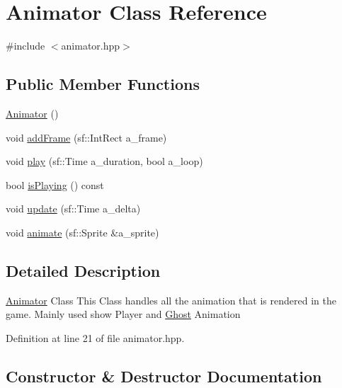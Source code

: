 \hypertarget{class_animator}{}\section{Animator Class Reference}
\label{class_animator}


{\ttfamily \#include $<$animator.\+hpp$>$}

\subsection*{Public Member Functions}
\begin{DoxyCompactItemize}
\item 
\hyperlink{class_animator_a701eeb9283612be2027425efb06bbff7}{Animator} ()
\item 
void \hyperlink{class_animator_a69e57eedcfb49c3b6d7802ff906486b7}{add\+Frame} (sf\+::\+Int\+Rect a\+\_\+frame)
\item 
void \hyperlink{class_animator_a8220e9ec75ce8e3425e8ca44c309f700}{play} (sf\+::\+Time a\+\_\+duration, bool a\+\_\+loop)
\item 
bool \hyperlink{class_animator_af652cfa1671a9a8155f85b2b33f65a17}{is\+Playing} () const
\item 
void \hyperlink{class_animator_a79c476575fc1e1c50e8f119be6806cf0}{update} (sf\+::\+Time a\+\_\+delta)
\item 
void \hyperlink{class_animator_acb1e3abc21b1ea2133baa4bd089062a0}{animate} (sf\+::\+Sprite \&a\+\_\+sprite)
\end{DoxyCompactItemize}


\subsection{Detailed Description}
\hyperlink{class_animator}{Animator} Class This Class handles all the animation that is rendered in the game. Mainly used show Player and \hyperlink{class_ghost}{Ghost} Animation 

Definition at line 21 of file animator.\+hpp.



\subsection{Constructor \& Destructor Documentation}
\mbox{\label{class_animator_a701eeb9283612be2027425efb06bbff7}} 
